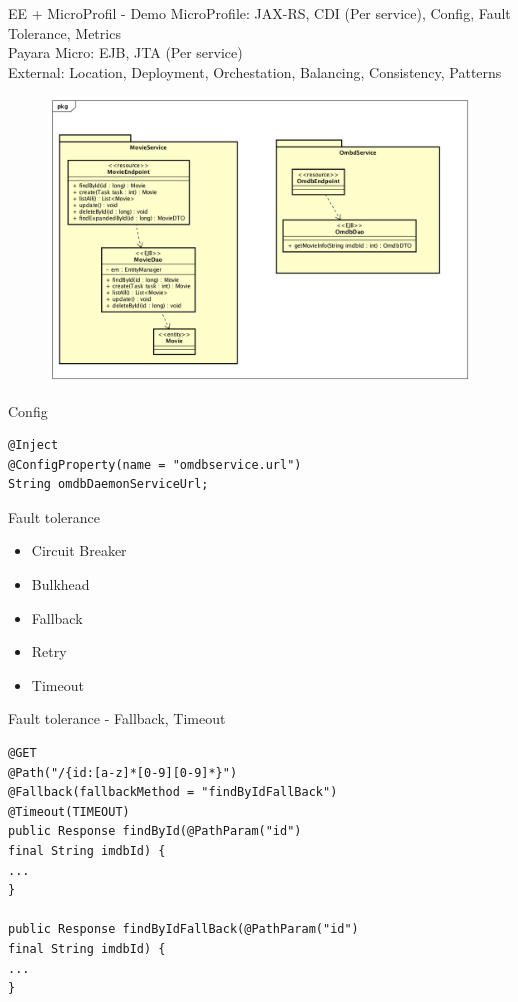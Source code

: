 \documentclass{beamer}
\begin{document}
\begin{frame}{EE + MicroProfil - Demo}
\footnotesize MicroProfile: JAX-RS, CDI (Per service), Config, Fault Tolerance, Metrics\\
Payara Micro: EJB, JTA (Per service)\\
External: Location, Deployment, Orchestation, Balancing, Consistency, Patterns
\begin{figure}
\centering
\includegraphics[width=0.95\linewidth]{Images/demomicro}
\end{figure}

\end{frame}

\begin{frame}[fragile]{Config}
\begin{lstlisting}
@Inject
@ConfigProperty(name = "omdbservice.url")
String omdbDaemonServiceUrl;
\end{lstlisting}
\end{frame}

\begin{frame}{Fault tolerance}

\begin{itemize}
\item Circuit Breaker
\item Bulkhead
\item Fallback
\item Retry
\item Timeout
\end{itemize}

\end{frame}


\begin{frame}[fragile]{Fault tolerance - Fallback, Timeout}
\begin{lstlisting}
@GET
@Path("/{id:[a-z]*[0-9][0-9]*}")
@Fallback(fallbackMethod = "findByIdFallBack")
@Timeout(TIMEOUT)
public Response findById(@PathParam("id") 
final String imdbId) {
...
}

public Response findByIdFallBack(@PathParam("id") 
final String imdbId) {
...
}
\end{lstlisting}
\end{frame}
\end{document}
